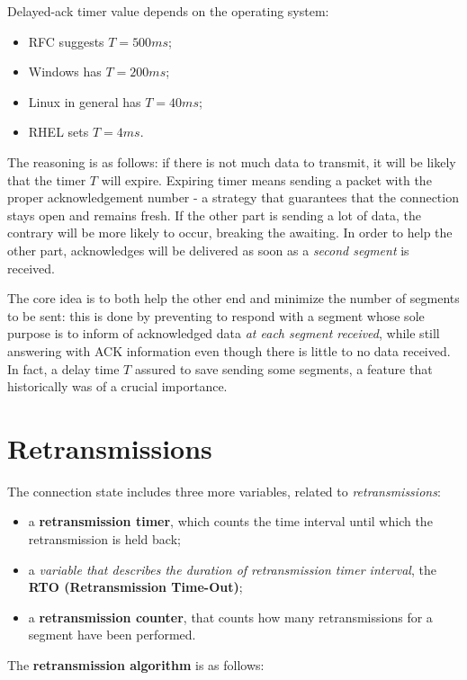 \documentclass[10pt]{book}
\begin{document}
Delayed-ack timer value depends on the operating system:

\begin{itemize}
	\item RFC suggests $T = 500ms$;
	\item Windows has $T = 200ms$;
	\item Linux in general has $T = 40ms$;
	\item RHEL sets $T = 4ms$.
\end{itemize}

The reasoning is as follows: if there is not much data to transmit, it will be
likely that the timer $T$ will expire. Expiring timer means sending a packet
with the proper acknowledgement number \-- a strategy that guarantees that the
connection stays open and remains fresh. If the other part is sending a lot of
data, the contrary will be more likely to occur, breaking the awaiting. In
order to help the other part, acknowledges will be delivered as soon as a
\emph{second segment} is received. 

The core idea is to both help the other end and
minimize the number of segments to be sent: this is done by preventing to
respond with a segment whose sole purpose is to inform of acknowledged data
\emph{at each segment received}, while still answering with ACK information
even though there is little to no data received. In fact, a delay time $T$
assured to save sending some segments, a feature that historically was of a
crucial importance.

\section{Retransmissions}

The connection state includes three more variables, related to
\emph{retransmissions}:

\begin{itemize}
    \item a \textbf{retransmission timer}, which counts the time interval until
        which the retransmission is held back;
	\item a \emph{variable that describes the duration of retransmission
        timer interval}, the \textbf{RTO (Retransmission Time-Out)};
    \item a \textbf{retransmission counter}, that counts how many
        retransmissions for a segment have been performed.
\end{itemize}

The \textbf{retransmission algorithm} is as follows:
\end{document}
